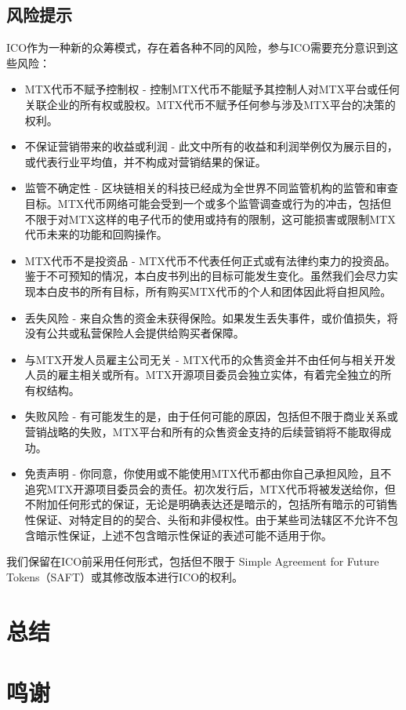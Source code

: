 \documentclass[UTF8,nofonts]{ctexart}
\begin{document}
\subsection{风险提示\label{sec:risks}}

ICO作为一种新的众筹模式，存在着各种不同的风险，参与ICO需要充分意识到这些风险：
\begin{itemize}
	\item MTX代币不赋予控制权 - 控制MTX代币不能赋予其控制人对MTX平台或任何关联企业的所有权或股权。MTX代币不赋予任何参与涉及MTX平台的决策的权利。
	\item 不保证营销带来的收益或利润 - 此文中所有的收益和利润举例仅为展示目的，或代表行业平均值，并不构成对营销结果的保证。
	\item 监管不确定性 - 区块链相关的科技已经成为全世界不同监管机构的监管和审查目标。MTX代币网络可能会受到一个或多个监管调查或行为的冲击，包括但不限于对MTX这样的电子代币的使用或持有的限制，这可能损害或限制MTX代币未来的功能和回购操作。
	\item MTX代币不是投资品 - MTX代币不代表任何正式或有法律约束力的投资品。鉴于不可预知的情况，本白皮书列出的目标可能发生变化。虽然我们会尽力实现本白皮书的所有目标，所有购买MTX代币的个人和团体因此将自担风险。
	\item 丢失风险 - 来自众售的资金未获得保险。如果发生丢失事件，或价值损失，将没有公共或私营保险人会提供给购买者保障。
	\item 与MTX开发人员雇主公司无关 - MTX代币的众售资金并不由任何与相关开发人员的雇主相关或所有。MTX开源项目委员会独立实体，有着完全独立的所有权结构。
	\item 失败风险 - 有可能发生的是，由于任何可能的原因，包括但不限于商业关系或营销战略的失败，MTX平台和所有的众售资金支持的后续营销将不能取得成功。
	\item 免责声明 - 你同意，你使用或不能使用MTX代币都由你自己承担风险，且不追究MTX开源项目委员会的责任。初次发行后，MTX代币将被发送给你，但不附加任何形式的保证，无论是明确表达还是暗示的，包括所有暗示的可销售性保证、对特定目的的契合、头衔和非侵权性。由于某些司法辖区不允许不包含暗示性保证，上述不包含暗示性保证的表述可能不适用于你。
\end{itemize}


我们保留在ICO前采用任何形式，包括但不限于 Simple Agreement for Future Tokens（SAFT）或其修改版本进行ICO的权利。

\section{总结\label{sec:summary}}

\section{鸣谢\label{sec:acknowledgement}}



\end{document}
